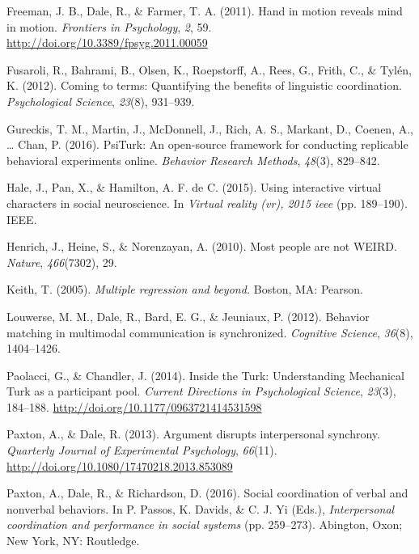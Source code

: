 \documentclass[10pt, letterpaper]{article}
\begin{document}
\hypertarget{ref-freeman2011hand}{}
Freeman, J. B., Dale, R., \& Farmer, T. A. (2011). Hand in motion
reveals mind in motion. \emph{Frontiers in Psychology}, \emph{2}, 59.
\url{http://doi.org/10.3389/fpsyg.2011.00059}

\hypertarget{ref-fusaroli2012coming}{}
Fusaroli, R., Bahrami, B., Olsen, K., Roepstorff, A., Rees, G., Frith,
C., \& Tylén, K. (2012). Coming to terms: Quantifying the benefits of
linguistic coordination. \emph{Psychological Science}, \emph{23}(8),
931--939.

\hypertarget{ref-gureckis2016psiturk}{}
Gureckis, T. M., Martin, J., McDonnell, J., Rich, A. S., Markant, D.,
Coenen, A., \ldots{} Chan, P. (2016). PsiTurk: An open-source framework
for conducting replicable behavioral experiments online. \emph{Behavior
Research Methods}, \emph{48}(3), 829--842.

\hypertarget{ref-hale2015using}{}
Hale, J., Pan, X., \& Hamilton, A. F. de C. (2015). Using interactive
virtual characters in social neuroscience. In \emph{Virtual reality
(vr), 2015 ieee} (pp. 189--190). IEEE.

\hypertarget{ref-henrich2010most}{}
Henrich, J., Heine, S., \& Norenzayan, A. (2010). Most people are not
WEIRD. \emph{Nature}, \emph{466}(7302), 29.

\hypertarget{ref-keith2005multiple}{}
Keith, T. (2005). \emph{Multiple regression and beyond.} Boston, MA:
Pearson.

\hypertarget{ref-louwerse2012behavior}{}
Louwerse, M. M., Dale, R., Bard, E. G., \& Jeuniaux, P. (2012). Behavior
matching in multimodal communication is synchronized. \emph{Cognitive
Science}, \emph{36}(8), 1404--1426.

\hypertarget{ref-paolacci2014inside}{}
Paolacci, G., \& Chandler, J. (2014). Inside the Turk: Understanding
Mechanical Turk as a participant pool. \emph{Current Directions in
Psychological Science}, \emph{23}(3), 184--188.
\url{http://doi.org/10.1177/0963721414531598}

\hypertarget{ref-paxton2013argument}{}
Paxton, A., \& Dale, R. (2013). Argument disrupts interpersonal
synchrony. \emph{Quarterly Journal of Experimental Psychology},
\emph{66}(11). \url{http://doi.org/10.1080/17470218.2013.853089}

\hypertarget{ref-paxton2016social}{}
Paxton, A., Dale, R., \& Richardson, D. (2016). Social coordination of
verbal and nonverbal behaviors. In P. Passos, K. Davids, \& C. J. Yi
(Eds.), \emph{Interpersonal coordination and performance in social
systems} (pp. 259--273). Abington, Oxon; New York, NY: Routledge.
\end{document}
